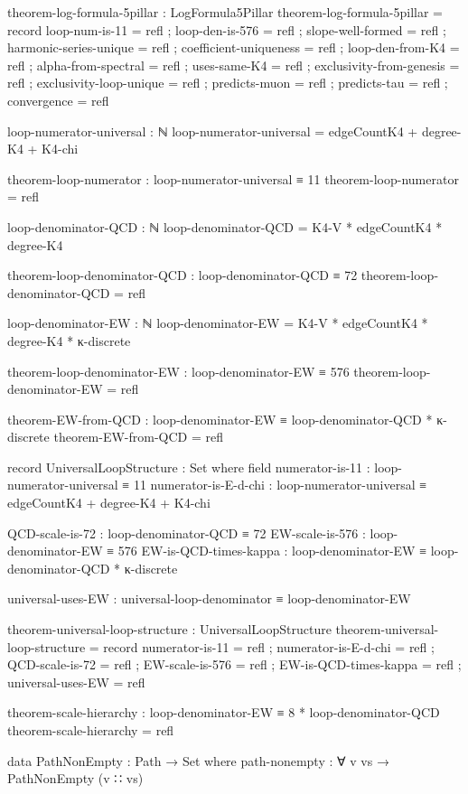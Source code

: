 \documentclass[11pt,a4paper]{book}
\begin{document}
\begin{code}
theorem-log-formula-5pillar : LogFormula5Pillar
theorem-log-formula-5pillar = record
  { loop-num-is-11         = refl
  ; loop-den-is-576        = refl
  ; slope-well-formed      = refl
  ; harmonic-series-unique = refl
  ; coefficient-uniqueness = refl
  ; loop-den-from-K4       = refl
  ; alpha-from-spectral    = refl
  ; uses-same-K4           = refl
  ; exclusivity-from-genesis = refl
  ; exclusivity-loop-unique = refl
  ; predicts-muon          = refl
  ; predicts-tau           = refl
  ; convergence            = refl
  }

loop-numerator-universal : ℕ
loop-numerator-universal = edgeCountK4 + degree-K4 + K4-chi

theorem-loop-numerator : loop-numerator-universal ≡ 11
theorem-loop-numerator = refl

loop-denominator-QCD : ℕ
loop-denominator-QCD = K4-V * edgeCountK4 * degree-K4

theorem-loop-denominator-QCD : loop-denominator-QCD ≡ 72
theorem-loop-denominator-QCD = refl

loop-denominator-EW : ℕ
loop-denominator-EW = K4-V * edgeCountK4 * degree-K4 * κ-discrete

theorem-loop-denominator-EW : loop-denominator-EW ≡ 576
theorem-loop-denominator-EW = refl

theorem-EW-from-QCD : loop-denominator-EW ≡ loop-denominator-QCD * κ-discrete
theorem-EW-from-QCD = refl

record UniversalLoopStructure : Set where
  field
    numerator-is-11 : loop-numerator-universal ≡ 11
    numerator-is-E-d-chi : loop-numerator-universal ≡ edgeCountK4 + degree-K4 + K4-chi
    
    QCD-scale-is-72 : loop-denominator-QCD ≡ 72
    EW-scale-is-576 : loop-denominator-EW ≡ 576
    EW-is-QCD-times-kappa : loop-denominator-EW ≡ loop-denominator-QCD * κ-discrete
    
    universal-uses-EW : universal-loop-denominator ≡ loop-denominator-EW

theorem-universal-loop-structure : UniversalLoopStructure
theorem-universal-loop-structure = record
  { numerator-is-11 = refl
  ; numerator-is-E-d-chi = refl
  ; QCD-scale-is-72 = refl
  ; EW-scale-is-576 = refl
  ; EW-is-QCD-times-kappa = refl
  ; universal-uses-EW = refl
  }

theorem-scale-hierarchy : loop-denominator-EW ≡ 8 * loop-denominator-QCD
theorem-scale-hierarchy = refl

data PathNonEmpty : Path → Set where
  path-nonempty : ∀ {v vs} → PathNonEmpty (v ∷ vs)


\end{code}
\end{document}
